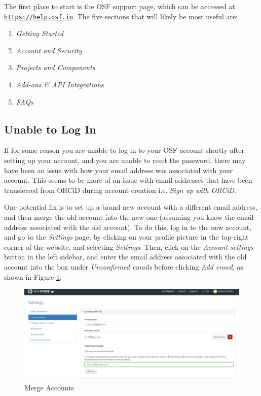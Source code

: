 \documentclass{scrartcl}
\begin{document}
The first place to start is the OSF support page, which can be accessed at \href{https://help.osf.io}{\texttt{https://help.osf.io}}.
The five sections that will likely be most useful are:

\begin{enumerate}
    \item \emph{Getting Started}
    \item \emph{Account and Security}
    \item \emph{Projects and Components}
    \item \emph{Add-ons \& API Integrations}
    \item \emph{FAQs}
\end{enumerate}

\subsection{Unable to Log In}

If for some reason you are unable to log in to your OSF account shortly after setting up your account, and you are unable to reset the password, there may have been an issue with how your email address was associated with your account.
This seems to be more of an issue with email addresses that have been transferred from ORCiD during account creation i.e. \emph{Sign up with ORCiD}.

One potential fix is to set up a brand new account with a different email address, and then merge the old account into the new one (assuming you know the email address associated with the old account).
To do this, log in to the new account, and go to the \emph{Settings} page, by clicking on your profile picture in the top-right corner of the website, and selecting \emph{Settings}.
Then, click on the \emph{Account settings} button in the left sidebar, and enter the email address associated with the old account into the box under \emph{Unconfirmed emails} before clicking \emph{Add email}, as shown in Figure \ref{fig:merge-accounts}.

\begin{figure}[!htb]
    \centering
    \includegraphics[width=\textwidth]{merge-accounts.png}
    \caption{Merge Accounts}
    \label{fig:merge-accounts}
\end{figure}
\end{document}

